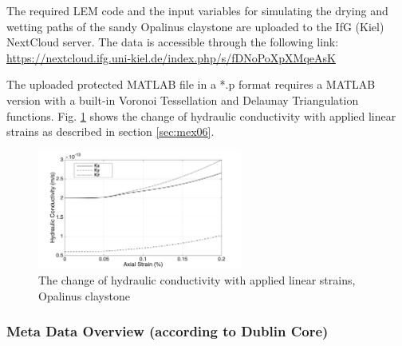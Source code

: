 The required LEM code and the input variables for simulating the drying and wetting paths of the sandy Opalinus claystone are uploaded to the IfG (Kiel) NextCloud server. The data is accessible through the following link:\\
\url{https://nextcloud.ifg.uni-kiel.de/index.php/s/fDNoPoXpXMqeAsK}

The uploaded protected MATLAB file in a *.p format requires a MATLAB version with a built-in Voronoi Tessellation and Delaunay Triangulation functions. Fig. \ref{fig:Amir_ME6_Lattice_Drying_Data} shows the change of hydraulic conductivity with applied linear strains as described in section \ref {sec:mex06}. 

\begin{figure}[!ht]
\centering
\includegraphics[width=0.6\textwidth]{figures/Amir_ME6_Lattice_Drying_Data.png}
\caption{The change of hydraulic conductivity with applied linear strains, Opalinus claystone}
\label{fig:Amir_ME6_Lattice_Drying_Data}
\end{figure}

\subsubsection*{Meta Data Overview (according to Dublin Core)}

